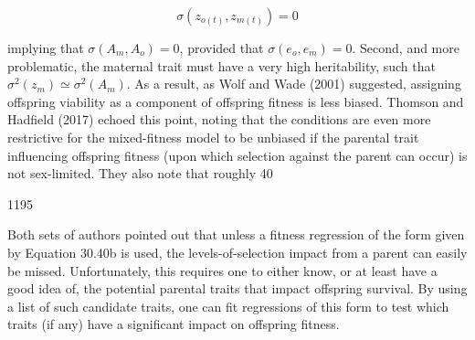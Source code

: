 \documentclass{article}
\begin{document}
\begin{equation}
\sigma\left(z_{o(t)},z_{m(t)}\right)=0
\end{equation}

implying that  $ \sigma(A_m, A_o) = 0 $, provided that  $ \sigma(e_o, e_m) = 0 $. Second, and more problematic, the maternal trait must have a very high heritability, such that  $ \sigma^2(z_m) \simeq \sigma^2(A_m) $. As a result, as Wolf and Wade (2001) suggested, assigning offspring viability as a component of offspring fitness is less biased. Thomson and Hadfield (2017) echoed this point, noting that the conditions are even more restrictive for the mixed-fitness model to be unbiased if the parental trait influencing offspring fitness (upon which selection against the parent can occur) is not sex-limited. They also note that roughly 40%

1195

Both sets of authors pointed out that unless a fitness regression of the form given by Equation 30.40b is used, the levels-of-selection impact from a parent can easily be missed. Unfortunately, this requires one to either know, or at least have a good idea of, the potential parental traits that impact offspring survival. By using a list of such candidate traits, one can fit regressions of this form to test which traits (if any) have a significant impact on offspring fitness.
\end{document}
